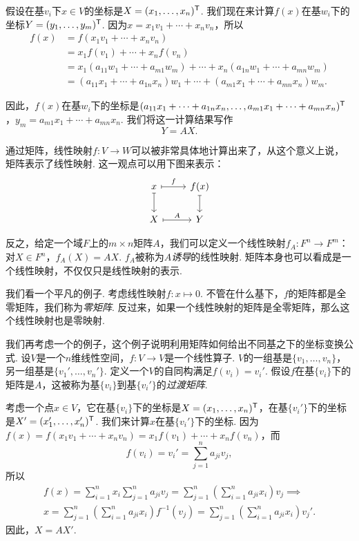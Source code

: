假设在基$v_i$下$x\in V$的坐标是$X=(x_1,\dots,x_n)^{\mathsf{T}}$. 我们现在来计算$f(x)$在基$w_i$下的坐标$Y=(y_1,\dots,y_m)^{\mathsf{T}}$. 因为$x=x_1v_1+\cdots+x_nv_n$，所以
\begin{align*}
    f(x)&=f(x_1v_1+\cdots+x_nv_n)\\
    &=x_1f(v_1)+\cdots+x_nf(v_n)\\
    &=x_1(a_{11}w_1+\cdots+a_{m1}w_m)+\cdots+x_n(a_{1n}w_1+\cdots+a_{mn}w_m)\\
    &=(a_{11}x_1+\cdots+a_{1n}x_n)w_1+\cdots+(a_{m1}x_1+\cdots+a_{mn}x_n)w_m.
\end{align*}

因此，$f(x)$在基$w_i$下的坐标是$(a_{11}x_1+\cdots+a_{1n}x_n,\dots,a_{m1}x_1+\cdots+a_{mn}x_n)^{\mathsf{T}}$，$y_m=a_{m1}x_1+\cdots+a_{mn}x_n$. 我们将这一计算结果写作
\[Y=AX.\]


通过矩阵，线性映射$f:V\to W$可以被非常具体地计算出来了，从这个意义上说，矩阵表示了线性映射. 这一观点可以用下图来表示：
\[\begin{tikzcd}
    x\arrow[r,mapsto,"f"]\arrow[d,mapsto]&f(x)\arrow[d,mapsto]\\
    X\arrow[r,mapsto,"A"]&Y
    \end{tikzcd}\] 

反之，给定一个域$F$上的$m\times n$矩阵$A$，我们可以定义一个线性映射$f_A:F^n\to F^m$：对$X\in F^n$，$f_A(X)=AX$. $f_A$被称为$A$\emph{诱导}的线性映射. 矩阵本身也可以看成是一个线性映射，不仅仅只是线性映射的表示. 

我们看一个平凡的例子. 考虑线性映射$f:x\mapsto 0$. 不管在什么基下，$f$的矩阵都是全零矩阵，我们称为\emph{零矩阵}. 反过来，如果一个线性映射的矩阵是全零矩阵，那么这个线性映射也是零映射. 

我们再考虑一个的例子，这个例子说明利用矩阵如何给出不同基之下的坐标变换公式. 设$V$是一个$n$维线性空间，$f:V\to V$是一个线性算子. $V$的一组基是$\{v_1,\dots,v_n\}$，另一组基是$\{v_1',\dots,v_n'\}$. 定义一个$V$的自同构满足$f(v_i)=v_i'$. 假设$f$在基$\{v_i\}$下的矩阵是$A$，这被称为基$\{v_i\}$到基$\{v_i'\}$的\emph{过渡矩阵}.

考虑一个点$x\in V$，它在基$\{v_i\}$下的坐标是$X=(x_1,\dots,x_n)^{\mathsf{T}}$，在基$\{v_i'\}$下的坐标是$X'=(x_1',\dots,x_n')^{\mathsf{T}}$. 我们来计算$x$在基$\{v_i'\}$下的坐标. 因为$f(x)=f(x_1v_1+\cdots+x_nv_n)=x_1f(v_1)+\cdots+x_nf(v_n)$，而
\[f(v_i)=v_i'=\sum_{j=1}^n a_{ji}v_j,\]
所以
\begin{gather*}
f(x)=\sum_{i=1}^n x_i\sum_{j=1}^n a_{ji}v_j=\sum_{j=1}^n\left(\sum_{i=1}^n a_{ji}x_i\right)v_j\implies\\
 x=\sum_{j=1}^n\left(\sum_{i=1}^n a_{ji}x_i\right)f^{-1}(v_j)=\sum_{j=1}^n\left(\sum_{i=1}^n a_{ji}x_i\right)v_j'.
\end{gather*}
因此，$X=AX'$.


